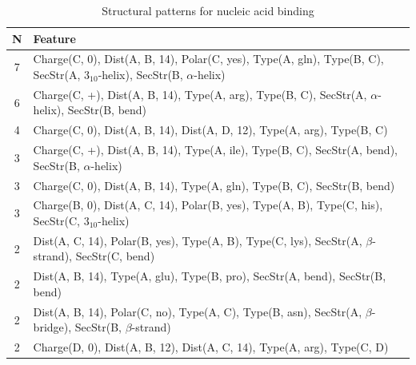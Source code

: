 \documentclass[11pt,twoside,a4paper]{book}
\begin{document}
\begin{table}\begin{tabularx}{\textwidth}{cX}\textbf{N} & \textbf{Feature} \\ \hline  
7 & Charge(C, 0), Dist(A, B, 14), Polar(C, yes),  Type(A, gln), Type(B, C), \newline SecStr(A, $3_{10}$-helix), SecStr(B, $\alpha$-helix)\\ \hline 
6 & Charge(C, +), Dist(A, B, 14),  Type(A, arg), Type(B, C), SecStr(A, $\alpha$-helix), \newline SecStr(B, bend)\\ \hline 
4 & Charge(C, 0), Dist(A, B, 14), Dist(A, D, 12),   Type(A, arg), Type(B, C)\\ \hline 
3 & Charge(C, +), Dist(A, B, 14),  Type(A, ile), Type(B, C), SecStr(A, bend), \newline SecStr(B, $\alpha$-helix)\\ \hline 
3 & Charge(C, 0), Dist(A, B, 14),  Type(A, gln), Type(B, C), SecStr(B, bend)\\ \hline 
3 & Charge(B, 0), Dist(A, C, 14), Polar(B, yes),  Type(A, B), Type(C, his), \newline SecStr(C, $3_{10}$-helix)\\ \hline 
2 & Dist(A, C, 14), Polar(B, yes),  Type(A, B), Type(C, lys), SecStr(A, $\beta$-strand), \newline SecStr(C, bend)\\ \hline 
2 & Dist(A, B, 14),  Type(A, glu), Type(B, pro), SecStr(A, bend), SecStr(B, bend)\\ \hline 
2 & Dist(A, B, 14), Polar(C, no),  Type(A, C), Type(B, asn), SecStr(A, $\beta$-bridge), \newline SecStr(B, $\beta$-strand)\\ \hline 
2 & Charge(D, 0), Dist(A, B, 12), Dist(A, C, 14),   Type(A, arg), Type(C, D)\\ \hline 
 \end{tabularx}\caption{Structural patterns for nucleic acid binding}\label{tab:nucleic_acid_binding}\end{table}
\end{document}
